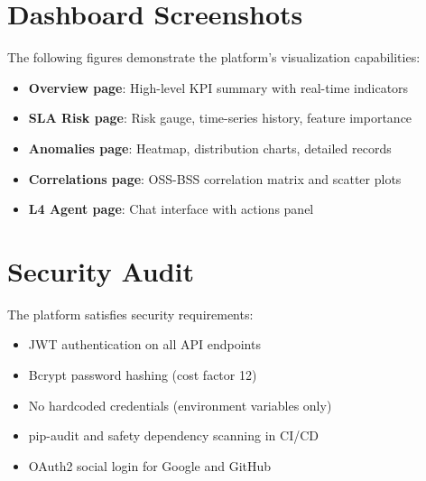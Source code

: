 \section{Dashboard Screenshots}

The following figures demonstrate the platform's visualization capabilities:

\begin{itemize}
    \item \textbf{Overview page}: High-level KPI summary with real-time indicators
    \item \textbf{SLA Risk page}: Risk gauge, time-series history, feature importance
    \item \textbf{Anomalies page}: Heatmap, distribution charts, detailed records
    \item \textbf{Correlations page}: OSS-BSS correlation matrix and scatter plots
    \item \textbf{L4 Agent page}: Chat interface with actions panel
\end{itemize}


\section{Security Audit}

The platform satisfies security requirements:
\begin{itemize}
    \item JWT authentication on all API endpoints
    \item Bcrypt password hashing (cost factor 12)
    \item No hardcoded credentials (environment variables only)
    \item pip-audit and safety dependency scanning in CI/CD
    \item OAuth2 social login for Google and GitHub
\end{itemize}
